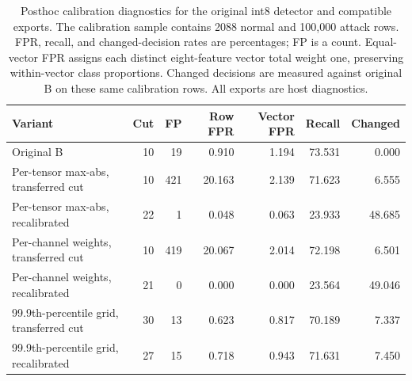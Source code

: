 \begin{table}[t]
\caption{Posthoc calibration diagnostics for the original int8 detector and compatible exports. The calibration sample contains 2088 normal and 100,000 attack rows. FPR, recall, and changed-decision rates are percentages; FP is a count. Equal-vector FPR assigns each distinct eight-feature vector total weight one, preserving within-vector class proportions. Changed decisions are measured against original B on these same calibration rows. All exports are host diagnostics.}
\label{tab:posthoc035}
\small
\setlength{\tabcolsep}{4pt}
\begin{tabular}{lrrrrrr}
\toprule
Variant & Cut & FP & Row FPR & Vector FPR & Recall & Changed \\
\midrule
Original B & 10 & 19 & 0.910 & 1.194 & 73.531 & 0.000 \\
Per-tensor max-abs, transferred cut & 10 & 421 & 20.163 & 2.139 & 71.623 & 6.555 \\
Per-tensor max-abs, recalibrated & 22 & 1 & 0.048 & 0.063 & 23.933 & 48.685 \\
Per-channel weights, transferred cut & 10 & 419 & 20.067 & 2.014 & 72.198 & 6.501 \\
Per-channel weights, recalibrated & 21 & 0 & 0.000 & 0.000 & 23.564 & 49.046 \\
99.9th-percentile grid, transferred cut & 30 & 13 & 0.623 & 0.817 & 70.189 & 7.337 \\
99.9th-percentile grid, recalibrated & 27 & 15 & 0.718 & 0.943 & 71.631 & 7.450 \\
\bottomrule
\end{tabular}
\end{table}
